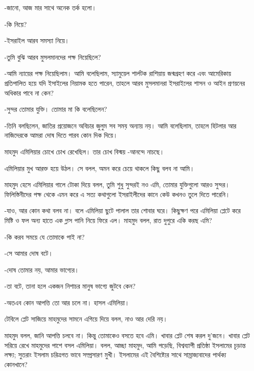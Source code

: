 \documentclass[
]{book}
\begin{document}
-জানো, আজ মার সাথে অনেক তর্ক হলো।

-কি নিয়ে?

-ইসরাইল আরব সমস্যা নিয়ে।

-তুমি বুঝি আরব মুসলমানদের পক্ষ নিয়েছিলে?

-আমি ন্যায়ের পক্ষ নিয়েছিলাম। আমি বলেছিলাম, স্যামুয়েল শার্লটক রাশিয়ায় জন্মগ্রহণ করে এবং আমেরিকায় প্রতিপালিত হয়ে যদি ইসাইলের নিয়ামক হতে পারেন, তাহলে আরব মুসলমানরা ইসরাইলের শাসন ও আইন প্রণয়নের অধিকার পাবে না কেন?

-সুন্দর তোমার যুক্তি। তোমার মা কি বলেছিলেন?

-তিনি বলছিলেন, জাতির প্রয়োজনে অবিচার জুলুম সব সময় অন্যায় নয়। আমি বলেছিলাম, তাহলে হিটলার আর নাজিদেরকে আমরা দোষ দিতে পারব কোন দিক দিয়ে।

মাহমুদ এমিলিয়ার চোখে চোখ রেখেছিল। তার চোখ বিস্ময় -আনন্দে নাচছে।

এমিলিয়ার মুখ আরক্ত হয়ে উঠল। সে বলল, অমন করে চেয়ে থাকলে কিছু বলব না আমি।

মাহমুদ হেসে এমিলিয়ার গালে টোকা দিয়ে বলল, তুমি শুধু সুন্দরই নও এমি, তোমার যুক্তিগুলো আরও সুন্দর। ফিলিস্তিনীদের পক্ষ থেকে এমন করে এ সত্য কথাগুলো ইসরাইলীদের কানে কেউ কখনও তুলে দিতে পারেনি।

-যাও, আর কোন কথা বলব না। বলে এমিলিয়া ছুটে পালাল তার শোবার ঘরে। কিছুক্ষণ পরে এমিলিয়া প্লেটে করে মিষ্টি ও ফল অন্য হাতে এক গ্লাস পানি নিয়ে ফিরে এল। মাহমুদ বলল, রাত দুপুরে একি করছ এমি?

-কি করব সময়ে যে তোমাকে পাই না?

-সে আমার দোষ বটে।

-দোষ তোমার নয়, আমার ভাগ্যের।

-তা বটে, তানা হলে একজন নিশাচর মানুষ ভাগ্যে জুটবে কেন?

-অতএব কোন আপত্তি তো আর চলে না। হাসল এমিলিয়া।

টেবিলে প্লেট সাজিয়ে মাহমুদের সামনে এগিয়ে দিয়ে বলল, নাও আর দেরি নয়।

মাহমুদ বলল, জানি আপত্তি চলবে না। কিন্তু তোমাকেও বসতে হবে এমি। খাবার প্লেট শেষ করল দু'জনে। খাবার প্লেট সরিয়ে রেখে মাহমুদের পাশে বসল এমিলিয়া। বলল, আচ্ছা মাহমুদ, আমি পড়েছি, বিশ্বব্যাপী প্রতিষ্ঠা ইসলামের চূড়ান্ত লক্ষ্য; সুতরাং ইসলাম চরিত্রগত ভাবে সম্প্রসারণ মুখী। ইসলামের এই বৈশিষ্ট্যের সাথে সাম্রাজ্যবাদের পার্থক্য কোনখানে?
\end{document}
